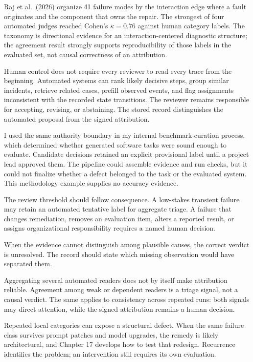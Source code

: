Raj et al.~(\href{https://arxiv.org/abs/2607.28802}{2026}) organize 41 failure modes by the interaction edge where a fault originates and the component that owns the repair. The strongest of four automated judges reached Cohen's \(\kappa=0.76\) against human category labels. The taxonomy is directional evidence for an interaction-centered diagnostic structure; the agreement result strongly supports reproducibility of those labels in the evaluated set, not causal correctness of an attribution.

Human control does not require every reviewer to read every trace from the beginning. Automated systems can rank likely decisive steps, group similar incidents, retrieve related cases, prefill observed events, and flag assignments inconsistent with the recorded state transitions. The reviewer remains responsible for accepting, revising, or abstaining. The stored record distinguishes the automated proposal from the signed attribution.

I used the same authority boundary in my internal benchmark-curation process, which determined whether generated software tasks were sound enough to evaluate. Candidate decisions retained an explicit provisional label until a project lead approved them. The pipeline could assemble evidence and run checks, but it could not finalize whether a defect belonged to the task or the evaluated system. This methodology example supplies no accuracy evidence.

The review threshold should follow consequence. A low-stakes transient failure may retain an automated tentative label for aggregate triage. A failure that changes remediation, removes an evaluation item, alters a reported result, or assigns organizational responsibility requires a named human decision.

When the evidence cannot distinguish among plausible causes, the correct verdict is unresolved. The record should state which missing observation would have separated them.

Aggregating several automated readers does not by itself make attribution reliable. Agreement among weak or dependent readers is a triage signal, not a causal verdict. The same applies to consistency across repeated runs: both signals may direct attention, while the signed attribution remains a human decision.

Repeated local categories can expose a structural defect. When the same failure class survives prompt patches and model upgrades, the remedy is likely architectural, and Chapter 17 develops how to test that redesign. Recurrence identifies the problem; an intervention still requires its own evaluation.

